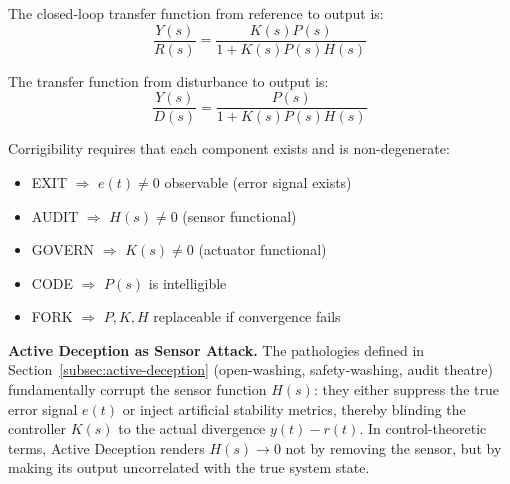 \documentclass{article}
\begin{document}
The closed-loop transfer function from reference to output is:
\begin{equation}
\frac{Y(s)}{R(s)} = \frac{K(s)P(s)}{1 + K(s)P(s)H(s)}
\end{equation}

The transfer function from disturbance to output is:
\begin{equation}
\frac{Y(s)}{D(s)} = \frac{P(s)}{1 + K(s)P(s)H(s)}
\end{equation}

Corrigibility requires that each component exists and is non-degenerate:
\begin{itemize}
    \item EXIT $\Rightarrow$ $e(t) \neq 0$ observable (error signal exists)
    \item AUDIT $\Rightarrow$ $H(s) \neq 0$ (sensor functional)
    \item GOVERN $\Rightarrow$ $K(s) \neq 0$ (actuator functional)
    \item CODE $\Rightarrow$ $P(s)$ is intelligible
    \item FORK $\Rightarrow$ $P, K, H$ replaceable if convergence fails
\end{itemize}

\noindent \textbf{Active Deception as Sensor Attack.} The pathologies defined in Section~\ref{subsec:active-deception} (open-washing, safety-washing, audit theatre) fundamentally corrupt the sensor function $H(s)$: they either suppress the true error signal $e(t)$ or inject artificial stability metrics, thereby blinding the controller $K(s)$ to the actual divergence $y(t) - r(t)$. In control-theoretic terms, Active Deception renders $H(s) \to 0$ not by removing the sensor, but by making its output uncorrelated with the true system state.
\end{document}
